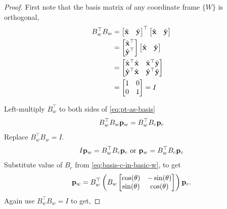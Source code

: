\documentclass[twocolumn]{article}
\begin{document}
\begin{proof}
  First note  that the basis matrix of any coordinate frame $\{W\}$ is
  orthogonal,
  \begin{align}
    B_w^\top B_w &= \begin{bmatrix}  \hat{\mathbf{x}} &  \hat{\mathbf{y}} \end{bmatrix}^\top
         \begin{bmatrix}  \hat{\mathbf{x}} &  \hat{\mathbf{y}} \end{bmatrix}
    \notag\\
    &=
    \begin{bmatrix}  \hat{\mathbf{x}}^\top \\  \hat{\mathbf{y}}^\top \end{bmatrix}
                                  \begin{bmatrix}  \hat{\mathbf{x}} &  \hat{\mathbf{y}} \end{bmatrix}
    \notag\\
    &=   \begin{bmatrix}  \hat{\mathbf{x}}^\top\hat{\mathbf{x}}  &   \hat{\mathbf{x}}^\top\hat{\mathbf{y}}
      \\  \hat{\mathbf{y}}^\top\hat{\mathbf{x}}  &  \hat{\mathbf{y}}^\top\hat{\mathbf{y}} \end{bmatrix}
    \notag\\
                 &=  \begin{bmatrix}
                   1 &  0  \\   0   &  1
                 \end{bmatrix} = I
  \end{align}

  Left-multiply $B_w^\top$ to both sides of \eqref{eq:pt-as-basis}
  \begin{align}
    B_w^\top  B_w \mathbf{p}_w = B_w^\top   B_c  \mathbf{p}_c
    \end{align}
    Replace $B_w^\top  B_w = I$.
    \begin{align}
      I \mathbf{p}_w = B_w^\top   B_c  \mathbf{p}_c
      \text{ or } \mathbf{p}_w = B_w^\top   B_c  \mathbf{p}_c
    \end{align}
    Substitute value  of $B_c$  from 
    \eqref{eq:basis-c-in-basic-w}, to get
    \begin{align}
      \mathbf{p}_w = B_w^\top   \left( B_w  \begin{bmatrix} \cos(\theta) &  -\sin(\theta) \\
        \sin(\theta) &   \cos(\theta) \end{bmatrix}   \right)\mathbf{p}_c.
    \end{align}
    Again  use $B_w^\top  B_w = I$ to get,


\end{proof}
\end{document}
